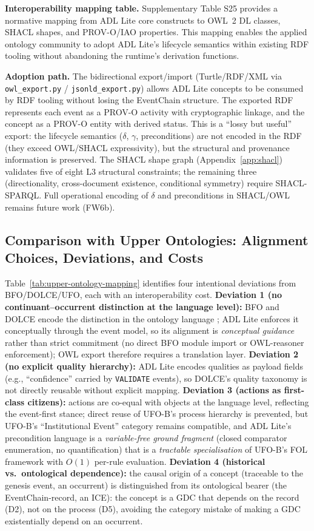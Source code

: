 \textbf{Interoperability mapping table.} Supplementary Table S25 provides a normative mapping from ADL Lite core constructs to OWL~2 DL classes, SHACL shapes, and PROV-O/IAO properties. This mapping enables the applied ontology community to adopt ADL Lite's lifecycle semantics within existing RDF tooling without abandoning the runtime's derivation functions.

\textbf{Adoption path.} The bidirectional export/import (Turtle/RDF/XML via \texttt{owl\_export.py} / \texttt{jsonld\_export.py}) allows ADL Lite concepts to be consumed by RDF tooling without losing the EventChain structure. The exported RDF represents each event as a PROV-O activity with cryptographic linkage, and the concept as a PROV-O entity with derived status. This is a ``lossy but useful'' export: the lifecycle semantics ($\delta$, $\gamma$, preconditions) are not encoded in the RDF (they exceed OWL/SHACL expressivity), but the structural and provenance information is preserved. The SHACL shape graph (Appendix~\ref{app:shacl}) validates five of eight L3 structural constraints; the remaining three (directionality, cross-document existence, conditional symmetry) require SHACL-SPARQL. Full operational encoding of $\delta$ and preconditions in SHACL/OWL remains future work (FW6b).

\subsection{Comparison with Upper Ontologies: Alignment Choices, Deviations, and Costs}\label{subsec:alignment-deviations}

Table~\ref{tab:upper-ontology-mapping} identifies four intentional deviations from BFO/DOLCE/UFO, each with an interoperability cost. \textbf{Deviation 1 (no continuant--occurrent distinction at the language level):} BFO and DOLCE encode the distinction in the ontology language \cite{bfo,dolce}; ADL Lite enforces it conceptually through the event model, so its alignment is \emph{conceptual guidance} rather than strict commitment (no direct BFO module import or OWL-reasoner enforcement); OWL export therefore requires a translation layer. \textbf{Deviation 2 (no explicit quality hierarchy):} ADL Lite encodes qualities as payload fields (e.g., ``confidence'' carried by \texttt{VALIDATE} events), so DOLCE's quality taxonomy is not directly reusable without explicit mapping. \textbf{Deviation 3 (actions as first-class citizens):} actions are co-equal with objects at the language level, reflecting the event-first stance; direct reuse of UFO-B's process hierarchy is prevented, but UFO-B's ``Institutional Event'' category \cite{guizzardi2024ufob} remains compatible, and ADL Lite's precondition language is a \emph{variable-free ground fragment} (closed comparator enumeration, no quantification) that is a \emph{tractable specialisation} of UFO-B's FOL framework with $O(1)$ per-rule evaluation. \textbf{Deviation 4 (historical vs.\ ontological dependence):} the causal origin of a concept (traceable to the genesis event, an occurrent) is distinguished from its ontological bearer (the EventChain-record, an ICE): the concept is a GDC that depends on the record (D2), not on the process (D5), avoiding the category mistake of making a GDC existentially depend on an occurrent.

